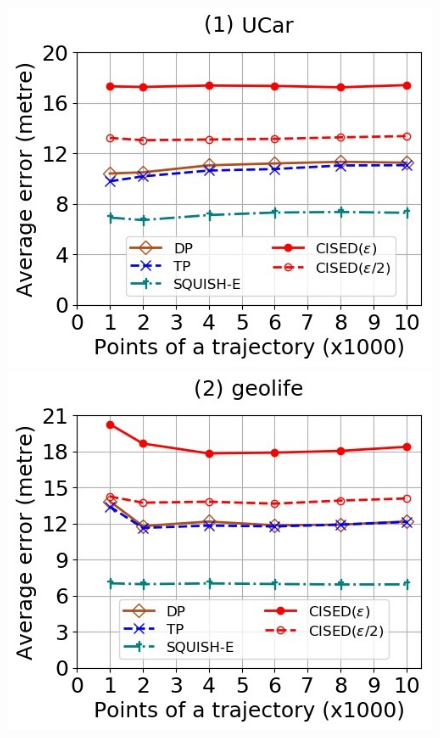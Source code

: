 \begin{figure}[tb!]
	\centering
	\includegraphics[scale=0.400]{Figures/Exp-where-SED-error-size-service.jpg} 	\hspace{2ex}
	\includegraphics[scale=0.400]{Figures/Exp-where-SED-error-size-geolife.jpg}	\hspace{2ex}

\end{figure}
